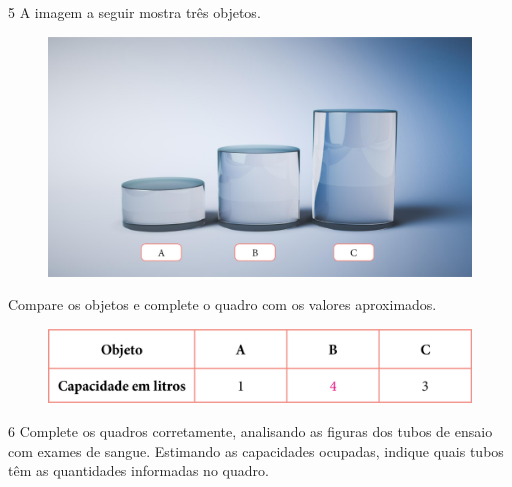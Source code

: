 
\pagebreak
\num{5} A imagem a seguir mostra três objetos.


\begin{figure}[htpb!]
\centering
\includegraphics[width=.6\textwidth]{./media/image34.png}
\end{figure}

Compare os objetos e complete o quadro com os valores aproximados.

\begin{figure}[htpb!]
\includegraphics[width=\textwidth]{./media/image35.png}
\end{figure}


\num{6} Complete os quadros corretamente, analisando as figuras dos tubos de
ensaio com exames de sangue. Estimando as capacidades ocupadas, indique
quais tubos têm as quantidades informadas no quadro.


